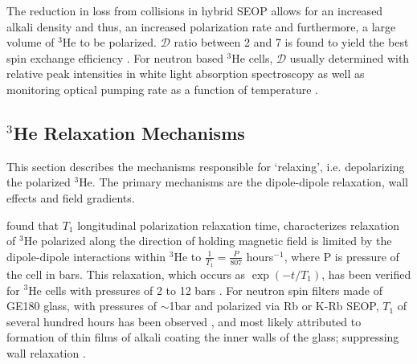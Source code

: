 
The reduction in loss from collisions in hybrid SEOP allows for an increased alkali density and thus, an increased polarization rate and furthermore, a large volume of $^3$He to be polarized. $\mathcal{D}$ ratio between 2 and 7 is found to yield the best spin exchange efficiency \cite{Chen2007, Chen2011, Chen2014}. For neutron based $^3$He cells, $\mathcal{D}$ usually determined with relative peak intensities in white light absorption spectroscopy as well as monitoring optical pumping rate as a function of temperature \cite{Chen2007, Chen2011, Chen2014}.

\subsection{$^{3}$He Relaxation Mechanisms}

This section describes the mechanisms responsible for `relaxing', i.e. depolarizing the polarized $^3$He. The primary mechanisms are the dipole-dipole relaxation, wall effects and field gradients.

\cite{Newbury1993} found that $T_1$ longitudinal polarization relaxation time, characterizes relaxation of $^3$He polarized along the direction of holding magnetic field is limited by the dipole-dipole interactions within $^3$He to $\frac{1}{T_1} = \frac{P}{807} $ hours$^{-1}$, where P is pressure of the cell in bars. This relaxation, which occurs as $\exp(-t/T_1)$, has been verified for $^3$He cells with pressures of 2 to 12 bars \cite{Smith1998}. For neutron spin filters made of GE180 glass, with pressures of $\sim$1bar and polarized via Rb or K-Rb SEOP, $T_1$ of several hundred hours has been observed \cite{Rich2002, Parnell2009, Chen2011}, and most likely attributed to formation of thin films of alkali coating the inner walls of the glass; suppressing wall relaxation \cite{Wu2021}.


